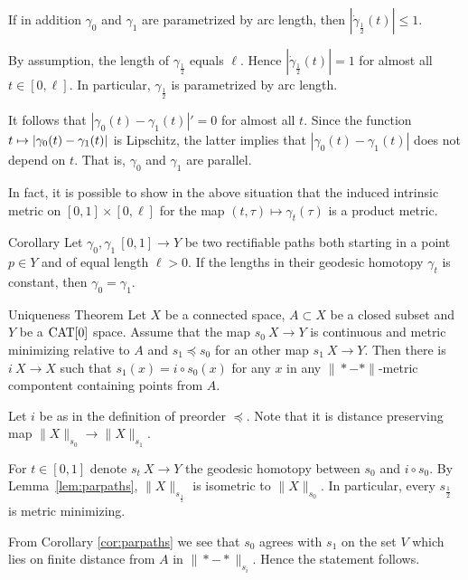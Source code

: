 \documentclass{article}
\begin{document}
If in addition $\gamma_0$ and $\gamma_1$ are parametrized by arc length, 
then $|\dot\gamma_{\frac12}(t)|\le 1$.

By assumption, the length of $\gamma_{\frac12}$ equals $\ell$. 
Hence $|\dot\gamma_{\frac12}(t)|=1$ for almost all $t\in[0,\ell]$. 
In particular, $\gamma_{\frac12}$
is parametrized by arc length. 

It follows that $|\gamma_{0}(t)-\gamma_{1}(t)|'=0$ for almost all $t$.
Since the function $t\zz\mapsto |\gamma_{0}(t)-\gamma_{1}(t)|$ is Lipschitz,
the latter  implies that $|\gamma_{0}(t)-\gamma_{1}(t)|$ does not depend on $t$.
That is, $\gamma_{0}$ and $\gamma_{1}$ are parallel.
\qeds

In fact, it is possible to show in the above situation that the induced intrinsic metric on $[0,1]\times[0,\ell]$
for the map $(t,\tau)\mapsto \gamma_t(\tau)$ is a product metric.

\begin{thm}{Corollary}\label{cor:parpaths}
Let $\gamma_0,\gamma_1\:[0,1]\to Y$ be two rectifiable paths both starting in a point $p\in Y$ and of equal length $\ell>0$. 
If the lengths in their geodesic homotopy $\gamma_t$ is constant, then $\gamma_{0}=\gamma_{1}$.
\end{thm}

\begin{thm}{Uniqueness Theorem}\label{prop:strict-mm}
Let $X$ be a connected space, 
$A\subset X$ be a closed subset 
and $Y$ be a $\mathop{\rm CAT}\nolimits[0]$ space.
Assume that the map $s_0\:X\to Y$ is continuous and metric minimizing relative to $A$ and 
$s_1\preccurlyeq s_0$ for an other map $s_1\:X\to Y$.
Then there is $i\:X\to X$ such that $s_1(x)=i\circ s_0(x)$ for any $x$ in any $\|{*}-{*}\|$-metric compontent containing points from $A$.
\end{thm}

Let $i$ be as in the definition of preorder  $\preccurlyeq$.
Note that it is distance preserving map $\|X\|_{s_0}\to \|X\|_{s_1}$.

For $t\in[0,1]$ denote $s_t\:X\to Y$ the geodesic homotopy between $s_0$ and $i\circ s_0$. 
By Lemma~\ref{lem:parpaths},  $\|X\|_{s_{\frac12}}$ is isometric to $\|X\|_{s_0}$. 
In particular, every $s_{\frac12}$ is metric minimizing.

From Corollary \ref{cor:parpaths} we see that $s_0$ agrees with $s_1$ on the set $V$ 
which lies on finite distance from $A$ in $\|{*}-{*}\|_{s_i}$.
Hence the statement follows.
\qeds
\end{document}
